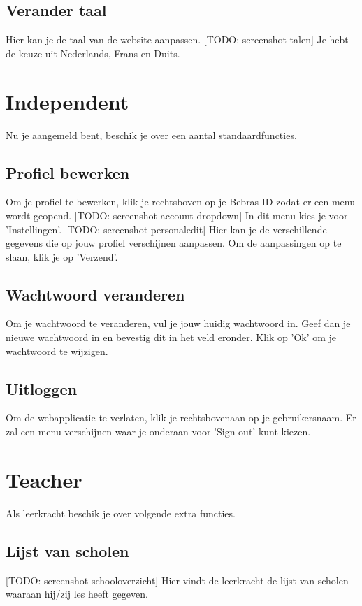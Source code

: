 \documentclass[]{article}
\begin{document}
\subsection{Verander taal}
Hier kan je de taal van de website aanpassen. [TODO: screenshot talen] Je hebt de keuze uit Nederlands, Frans en Duits.

\section{Independent}

Nu je aangemeld bent, beschik je over een aantal standaardfuncties.

\subsection{Profiel bewerken}
Om je profiel te bewerken, klik je rechtsboven op je Bebras-ID zodat er een menu wordt geopend. [TODO: screenshot account-dropdown] In dit menu kies je voor 'Instellingen'. [TODO: screenshot personaledit] Hier kan je de verschillende gegevens die op jouw profiel verschijnen aanpassen. Om de aanpassingen op te slaan, klik je op 'Verzend'.

\subsection{Wachtwoord veranderen}
Om je wachtwoord te veranderen, vul je jouw huidig wachtwoord in. Geef dan je nieuwe wachtwoord in en bevestig dit in het veld eronder. Klik op 'Ok' om je wachtwoord te wijzigen.

\subsection{Uitloggen}
Om de webapplicatie te verlaten, klik je rechtsbovenaan op je gebruikersnaam. Er zal een menu verschijnen waar je onderaan voor 'Sign out' kunt kiezen.

\section{Teacher}

Als leerkracht beschik je over volgende extra functies.

\subsection{Lijst van scholen}

[TODO: screenshot schooloverzicht]
Hier vindt de leerkracht de lijst van scholen waaraan hij/zij les heeft gegeven.
\end{document}
